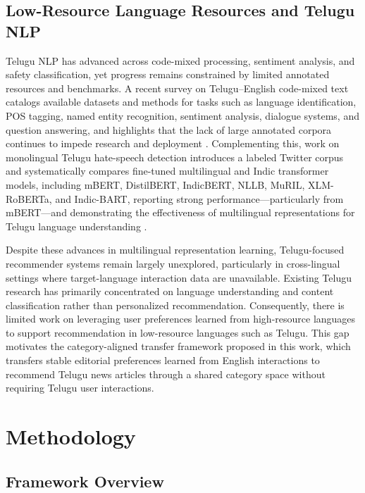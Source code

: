 \documentclass[conference]{IEEEtran}
\begin{document}
\subsection{Low-Resource Language Resources and Telugu NLP}

Telugu NLP has advanced across code-mixed processing, sentiment analysis, and safety classification, yet progress remains constrained by limited annotated resources and benchmarks. A recent survey on Telugu--English code-mixed text catalogs available datasets and methods for tasks such as language identification, POS tagging, named entity recognition, sentiment analysis, dialogue systems, and question answering, and highlights that the lack of large annotated corpora continues to impede research and deployment \cite{10.1145/3695766}. Complementing this, work on monolingual Telugu hate-speech detection introduces a labeled Twitter corpus and systematically compares fine-tuned multilingual and Indic transformer models, including mBERT, DistilBERT, IndicBERT, NLLB, MuRIL, XLM-RoBERTa, and Indic-BART, reporting strong performance—particularly from mBERT—and demonstrating the effectiveness of multilingual representations for Telugu language understanding \cite{KHANDUJA2024200112}.

Despite these advances in multilingual representation learning, Telugu-focused recommender systems remain largely unexplored, particularly in cross-lingual settings where target-language interaction data are unavailable. Existing Telugu research has primarily concentrated on language understanding and content classification rather than personalized recommendation. Consequently, there is limited work on leveraging user preferences learned from high-resource languages to support recommendation in low-resource languages such as Telugu. This gap motivates the category-aligned transfer framework proposed in this work, which transfers stable editorial preferences learned from English interactions to recommend Telugu news articles through a shared category space without requiring Telugu user interactions.
\section{Methodology}\label{method}
\subsection{Framework Overview}
\end{document}
